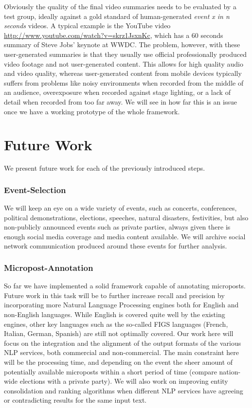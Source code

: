 \documentclass[runningheads,a4paper]{llncs}
\begin{document}
Obviously the quality of the final video summaries needs to be evaluated by a test group, ideally against a gold standard of human-generated \emph{event x in n seconds} videos. A typical example is the YouTube video \url{http://www.youtube.com/watch?v=skrz1JsxnKc}, which has a 60 seconds summary of Steve Jobs' keynote at WWDC. The problem, however, with these user-generated summaries is that they usually use official professionally produced video footage and not user-generated content. This allows for high quality audio and video quality, whereas user-generated content from mobile devices typically suffers from problems like noisy environments when recorded from the middle of an audience, overexposure when recorded against stage lighting, or a lack of detail when recorded from too far away. We will see in how far this is an issue once we have a working prototype of the whole framework.

\section{Future Work}
We present future work for each of the previously introduced steps.

\subsubsection{Event-Selection}
We will keep an eye on a wide variety of events, such as concerts, conferences, political demonstrations, elections, speeches, natural disasters, festivities, but also non-publicly announced events such as private parties, always given there is enough social media coverage and media content available. We will archive social network communication produced around these events for further analysis.

\subsubsection{Micropost-Annotation}
So far we have implemented a solid framework capable of annotating microposts. Future work in this task will be to further increase recall and precision by incorporating more Natural Language Processing engines both for English and non-English languages. While English is covered quite well by the existing engines, other key languages such as the so-called FIGS languages (French, Italian, German, Spanish) are still not optimally covered. Our work here will focus on the integration and the alignment of the output formats of the various NLP services, both commercial and non-commercial. The main constraint here will be the processing time, and depending on the event the sheer amount of potentially available microposts within a short period of time (compare nation-wide elections with a private party). We will also work on improving entity consolidation and ranking algorithms when different NLP services have agreeing or contradicting results for the same input text.
\end{document}

